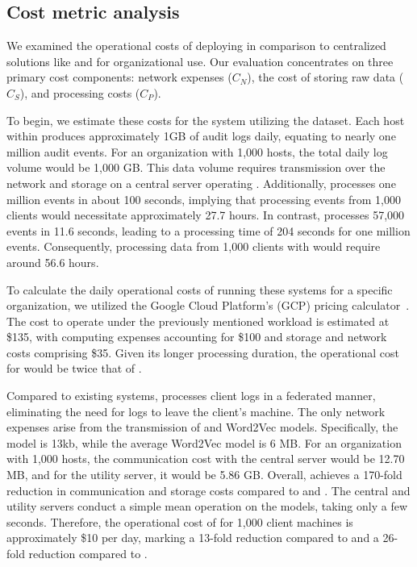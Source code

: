 \subsection{Cost metric analysis}
\label{cost_metric}
We examined the operational costs of deploying \Sys in comparison to centralized solutions like \flash and \kairos for organizational use. Our evaluation concentrates on three primary cost components: network expenses (\(C_{N}\)), the cost of storing raw data (\(C_{S}\)), and processing costs (\(C_{P}\)).

To begin, we estimate these costs for the \flash system utilizing the \optc dataset. Each host within \optc produces approximately 1GB of audit logs daily, equating to nearly one million audit events. For an organization with 1,000 hosts, the total daily log volume would be 1,000 GB. This data volume requires transmission over the network and storage on a central server operating \flash. Additionally, \flash processes one million events in about 100 seconds, implying that processing events from 1,000 clients would necessitate approximately 27.7 hours. In contrast, \kairos processes 57,000 events in 11.6 seconds, leading to a processing time of 204 seconds for one million events. Consequently, processing data from 1,000 clients with \kairos would require around 56.6 hours.

To calculate the daily operational costs of running these systems for a specific organization, we utilized the Google Cloud Platform's (GCP) pricing calculator~\cite{gcp}. The cost to operate \flash under the previously mentioned workload is estimated at \$135, with computing expenses accounting for \$100 and storage and network costs comprising \$35. Given its longer processing duration, the operational cost for \kairos would be twice that of \flash.

Compared to existing systems, \Sys processes client logs in a federated manner, eliminating the need for logs to leave the client's machine. The only network expenses arise from the transmission of \gnnshort and Word2Vec models. Specifically, the \gnnshort model is 13kb, while the average Word2Vec model is 6 MB. For an organization with 1,000 hosts, the communication cost with the central server would be 12.70 MB, and for the utility server, it would be 5.86 GB. Overall, \Sys achieves a 170-fold reduction in communication and storage costs compared to \flash and \kairos. The central and utility servers conduct a simple mean operation on the models, taking only a few seconds. Therefore, the operational cost of \Sys for 1,000 client machines is approximately \$10 per day, marking a 13-fold reduction compared to \flash and a 26-fold reduction compared to \kairos.

